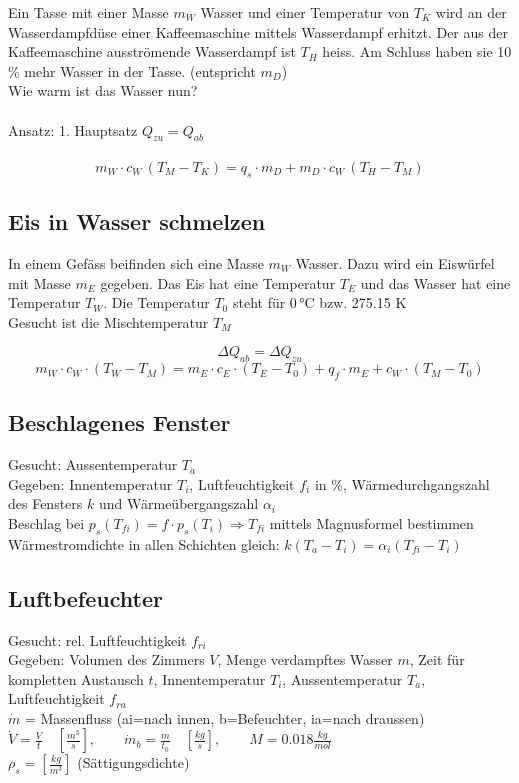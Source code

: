 Ein Tasse mit einer Masse $m_W$ Wasser und einer Temperatur von $T_K$ wird an
der Wasserdampfdüse einer Kaffeemaschine mittels Wasserdampf erhitzt. Der aus der
Kaffeemaschine ausströmende Wasserdampf ist $T_H$ heiss. Am Schluss haben sie 10 \%
mehr Wasser in der Tasse. (entspricht $m_D$)\\
Wie warm ist das Wasser nun? \\
\\
Ansatz: 1. Hauptsatz \quad $Q_{zu} = Q_{ab}$ \\
\\
$$ m_W \cdot c_W \, (T_M - T_K) = q_s \cdot m_D + m_D \cdot c_W \, (T_H - T_M) $$



\subsection{Eis in Wasser schmelzen}

In einem Gefäss beifinden sich eine Masse $m_W$ Wasser. Dazu wird ein Eiswürfel mit Masse $m_E$ gegeben. Das Eis hat eine Temperatur $T_E$ und das Wasser hat eine Temperatur $T_W$. Die Temperatur $T_0$ steht für $0 \, \text{°C}$ bzw. 275.15 K \\
Gesucht ist die Mischtemperatur $T_M$ 

$$ \Delta Q_{ab} = \Delta Q_{zu}$$
$$ m_W \cdot c_W \cdot (T_W - T_M) = m_E \cdot c_E \cdot (T_E - T_0) + q_f \cdot m_E + c_W \cdot (T_M - T_0) $$

\subsection{Beschlagenes Fenster}

Gesucht: Aussentemperatur $T_a$\\
Gegeben: Innentemperatur $T_i$, Luftfeuchtigkeit $f_i$ in $\%$, 
Wärmedurchgangszahl des Fensters $k$ und Wärmeübergangszahl $\alpha_i$\\

Beschlag bei $p_s(T_{fi}) = f \cdot p_s(T_i) \Rightarrow T_{fi} $ mittels Magnusformel bestimmen\\

Wärmestromdichte in allen Schichten gleich: $k(T_a - T_i) = \alpha_i(T_{fi} - T_i)$

\subsection{Luftbefeuchter}
Gesucht: rel. Luftfeuchtigkeit $f_{ri}$ \\
Gegeben: Volumen des Zimmers $V$, Menge verdampftes Wasser $m$, Zeit für kompletten Austausch $t$, Innentemperatur $T_i$, Aussentemperatur $T_a$, Luftfeuchtigkeit $f_{ra}$\\
$\dot{m}$ = Massenfluss (ai=nach innen, b=Befeuchter, ia=nach draussen)\\
$\dot{V} = \frac{V}{t} \quad [\frac{m^3}{s}] , \quad \quad \dot{m}_b = \frac{m}{t_0} \quad [\frac{kg}{s}], \quad \quad  M = \text{0.018} \frac{kg}{mol}$\\ 
$\rho_s = [\frac{kg}{m^3}]$ (Sättigungsdichte)

